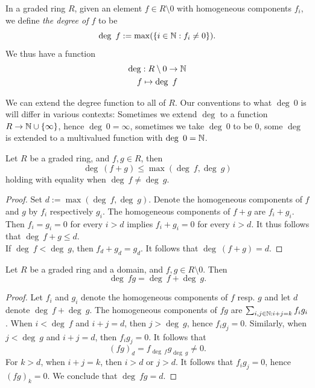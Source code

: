     \begin{definition}
        In a graded ring $R$, given an element $f\in R\setminus 0$ with homogeneous components $f_i$, we define \emph{the degree of $f$} to be 
        $$
            \deg \ f := \max(\{i\in \mathbb{N} : f_i\neq 0\}).  
        $$
        We thus have a function 
        \begin{gather*}
            \deg : R\setminus0\rightarrow \mathbb{N}\\
            f\mapsto \deg \ f 
        \end{gather*} 
    \end{definition}
    \begin{remark}
        We can extend the degree function to all of $R$. Our conventions to what $\deg\ 0$ is will differ in various contexts: Sometimes we extend $\deg$ to a function $R\rightarrow \mathbb{N}\cup\{\infty\}$, hence $\deg\ 0 = \infty$, sometimes we take $\deg \ 0$ to be $0$, some $\deg$ is extended to a multivalued function with $\deg \ 0 = \mathbb{N}$. 
    \end{remark}
    \begin{lemma}\label{DegreeOfSumOfElementsInGradedRing}
        Let $R$ be a graded ring, and $f,g\in R$, then  
        $$
            \deg\ (f+g) \leq \max(\deg\ f, \deg \ g)
        $$
        holding with equality when $\deg\ f \neq \deg\ g$. 
    \end{lemma}
    \begin{proof}
        Set $d:=\max(\deg\ f, \deg \ g)$. Denote the homogeneous components of $f$ and $g$ by $f_i$ respectively $g_i$. The homogeneous components of $f+g$ are $f_i+g_i$. Then $f_i=g_i=0$ for every $i> d$ implies $f_i+g_i=0$ for every $i>d$. It thus follows that $\deg \ f+g\leq d$.\\
        If $\deg \ f < \deg \ g$, then $f_d+g_d=g_d$. It follows that $\deg \ (f+g)=d$.
    \end{proof}
    \begin{lemma}
        Let $R$ be a graded ring and a domain, and $f,g\in R\setminus 0$. Then
        $$
            \deg \ fg = \deg \ f + \deg \ g.
        $$ 
    \end{lemma}
    \begin{proof}
        Let $f_i$ and $g_i$ denote the homogeneous components of $f$ resp. $g$ and let $d$ denote $\deg \ f +\deg \ g$. The homogeneous components of $fg$ are $\sum_{i,j\in \mathbb{N} : i+j = k} f_ig_i$. When $i<\deg \ f$ and $i+j = d$, then $j>\deg \ g$, hence $f_ig_j=0$. Similarly, when $j<\deg \ g$ and $i+j=d$, then $f_ig_j=0$. It follows that 
        $$
            (fg)_d = f_{\deg\ f}g_{\deg \ g}\neq 0.
        $$ 
        For $k>d$, when $i+j=k$, then $i>d$ or $j>d$. It follows that $f_ig_j=0$, hence $(fg)_k =0$. We conclude that $\deg \ fg =d$.
    \end{proof}
